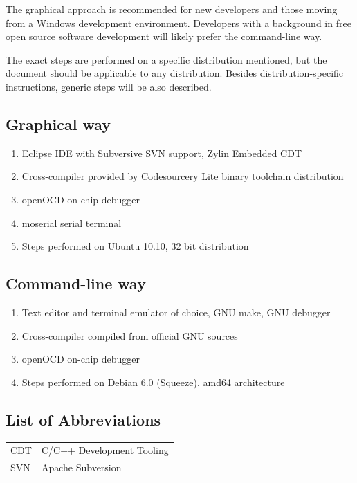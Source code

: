 \documentclass[a4paper, 10pt]{article}
\begin{document}
The graphical approach is recommended for new developers and those moving from a
Windows development environment. Developers with a background in free open
source software development will likely prefer the command-line way.

The exact steps are performed on a specific distribution mentioned, but the
document should be applicable to any distribution. Besides distribution-specific
instructions, generic steps will be also described.

\subsection{Graphical way}

\begin{enumerate}
\item Eclipse IDE with Subversive SVN support, Zylin Embedded CDT
\item Cross-compiler provided by Codesourcery Lite binary toolchain
distribution
\item openOCD on-chip debugger
\item moserial serial terminal
\item Steps performed on Ubuntu 10.10, 32 bit distribution
\end{enumerate}

\subsection{Command-line way}

\begin{enumerate}
\item Text editor and terminal emulator of choice, GNU make, GNU debugger
\item Cross-compiler compiled from official GNU sources
\item openOCD on-chip debugger
\item Steps performed on Debian 6.0 (Squeeze), amd64 architecture
\end{enumerate}

\newpage

\tableofcontents
\newpage

\listoffigures
\newpage

\subsection*{List of Abbreviations}
	\begin{tabular}{ l l }
    CDT	    & C/C++ Development Tooling \\
    SVN     & Apache Subversion \\
	\end{tabular}
\newpage
\end{document}
